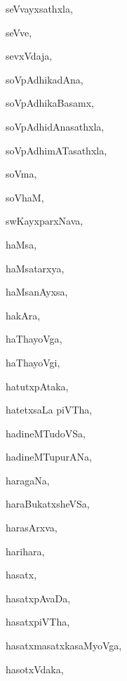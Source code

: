 \begin{multicols}{3}
{\noindent
{seVvayxsathxla}, \pageref{seVvayxsathxla}

\noindent
{seVve}, \pageref{seVve}

\noindent
{sevxVdaja}, \pageref{sevxVdaja}

\noindent
{soVpAdhikadAna}, \pageref{soVpAdhikadAna}

\noindent
{soVpAdhikaBasamx}, \pageref{soVpAdhikaBasamx}

\noindent
{soVpAdhidAnasathxla}, \pageref{soVpAdhidAnasathxla}

\noindent
{soVpAdhimATasathxla}, \pageref{soVpAdhimATasathxla}

\noindent
{soVma}, \pageref{soVma}

\noindent
{soVhaM}, \pageref{soVhaM}

\noindent
{swKayxparxNava}, \pageref{swKayxparxNava}

\bigskip
\noindent
{}
\smallskip

\noindent
{haMsa}, \pageref{haMsa}

\noindent
{haMsatarxya}, \pageref{haMsatarxya}

\noindent
{haMsanAyxsa}, \pageref{haMsanAyxsa}

\noindent
{hakAra}, \pageref{hakAra}

\noindent
{haThayoVga}, \pageref{haThayoVga}

\noindent
{haThayoVgi}, \pageref{haThayoVgi}

\noindent
{hatutxpAtaka}, \pageref{hatutxpAtaka}

\noindent
{hatetxsaLa piVTha}, \pageref{hatetxsaLapiVTha}

\noindent
{hadineMTudoVSa}, \pageref{hadineMTudoVSa}

\noindent
{hadineMTupurANa}, \pageref{hadineMTupurANa}

\noindent
{haragaNa}, \pageref{haragaNa}

\noindent
{haraBukatxsheVSa}, \pageref{haraBukatxsheVSa}

\noindent
{harasArxva}, \pageref{harasArxva}

\noindent
{harihara}, \pageref{harihara}

\noindent
{hasatx}, \pageref{hasatx}

\noindent
{hasatxpAvaDa}, \pageref{hasatxpAvaDa}

\noindent
{hasatxpiVTha}, \pageref{hasatxpiVTha}

\noindent
{hasatxmasatxkasaMyoVga}, \pageref{hasatxmasatxkasaMyoVga}

\noindent
{hasotxVdaka}, \pageref{hasotxVdaka}

}
\end{multicols}
